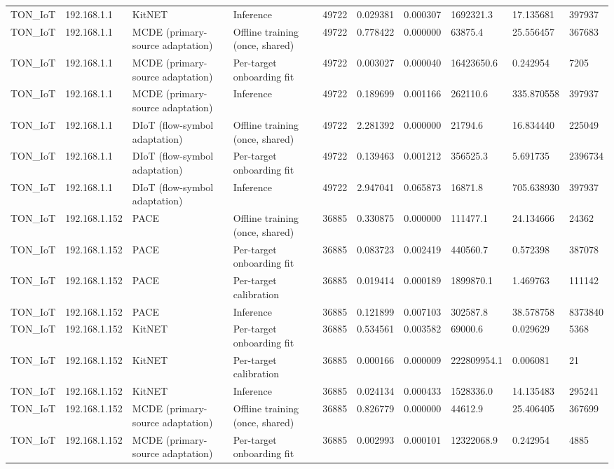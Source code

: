 \begin{tabular}{llllllllll}
TON\_IoT & 192.168.1.1 & KitNET & Inference & 49722 & 0.029381 & 0.000307 & 1692321.3 & 17.135681 & 397937 \\
TON\_IoT & 192.168.1.1 & MCDE (primary-source adaptation) & Offline training (once, shared) & 49722 & 0.778422 & 0.000000 & 63875.4 & 25.556457 & 367683 \\
TON\_IoT & 192.168.1.1 & MCDE (primary-source adaptation) & Per-target onboarding fit & 49722 & 0.003027 & 0.000040 & 16423650.6 & 0.242954 & 7205 \\
TON\_IoT & 192.168.1.1 & MCDE (primary-source adaptation) & Inference & 49722 & 0.189699 & 0.001166 & 262110.6 & 335.870558 & 397937 \\
TON\_IoT & 192.168.1.1 & DIoT (flow-symbol adaptation) & Offline training (once, shared) & 49722 & 2.281392 & 0.000000 & 21794.6 & 16.834440 & 225049 \\
TON\_IoT & 192.168.1.1 & DIoT (flow-symbol adaptation) & Per-target onboarding fit & 49722 & 0.139463 & 0.001212 & 356525.3 & 5.691735 & 2396734 \\
TON\_IoT & 192.168.1.1 & DIoT (flow-symbol adaptation) & Inference & 49722 & 2.947041 & 0.065873 & 16871.8 & 705.638930 & 397937 \\
TON\_IoT & 192.168.1.152 & PACE & Offline training (once, shared) & 36885 & 0.330875 & 0.000000 & 111477.1 & 24.134666 & 24362 \\
TON\_IoT & 192.168.1.152 & PACE & Per-target onboarding fit & 36885 & 0.083723 & 0.002419 & 440560.7 & 0.572398 & 387078 \\
TON\_IoT & 192.168.1.152 & PACE & Per-target calibration & 36885 & 0.019414 & 0.000189 & 1899870.1 & 1.469763 & 111142 \\
TON\_IoT & 192.168.1.152 & PACE & Inference & 36885 & 0.121899 & 0.007103 & 302587.8 & 38.578758 & 8373840 \\
TON\_IoT & 192.168.1.152 & KitNET & Per-target onboarding fit & 36885 & 0.534561 & 0.003582 & 69000.6 & 0.029629 & 5368 \\
TON\_IoT & 192.168.1.152 & KitNET & Per-target calibration & 36885 & 0.000166 & 0.000009 & 222809954.1 & 0.006081 & 21 \\
TON\_IoT & 192.168.1.152 & KitNET & Inference & 36885 & 0.024134 & 0.000433 & 1528336.0 & 14.135483 & 295241 \\
TON\_IoT & 192.168.1.152 & MCDE (primary-source adaptation) & Offline training (once, shared) & 36885 & 0.826779 & 0.000000 & 44612.9 & 25.406405 & 367699 \\
TON\_IoT & 192.168.1.152 & MCDE (primary-source adaptation) & Per-target onboarding fit & 36885 & 0.002993 & 0.000101 & 12322068.9 & 0.242954 & 4885 \\

\end{tabular}
